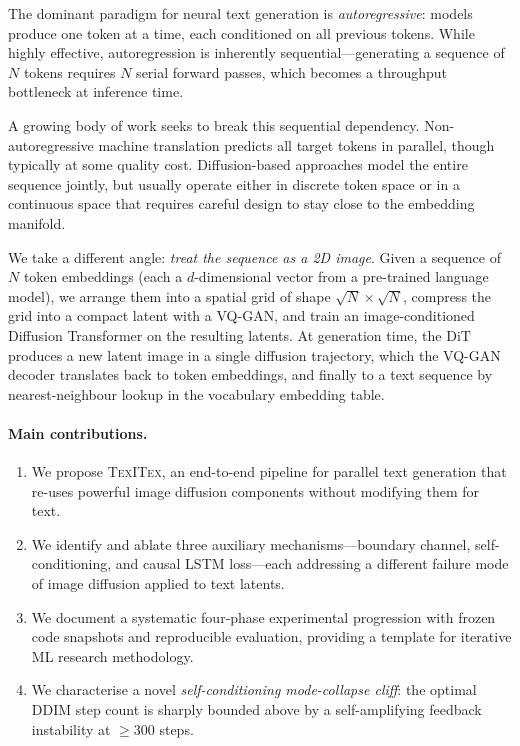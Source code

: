 \documentclass[11pt,a4paper]{article}
\newcommand{\texitex}{\textsc{TexITex}}
\begin{document}
The dominant paradigm for neural text generation is \emph{autoregressive}: models produce
one token at a time, each conditioned on all previous tokens. While highly effective,
autoregression is inherently sequential---generating a sequence of $N$ tokens requires
$N$ serial forward passes, which becomes a throughput bottleneck at inference time.

A growing body of work seeks to break this sequential dependency.
Non-autoregressive machine translation \citep{gu2018nat} predicts all target tokens
in parallel, though typically at some quality cost.
Diffusion-based approaches \citep{li2022diffusionlm,gong2023diffuseq,lovelace2023latent}
model the entire sequence jointly, but usually operate either in discrete token space
or in a continuous space that requires careful design to stay close to the embedding
manifold.

We take a different angle: \emph{treat the sequence as a 2D image}.
Given a sequence of $N$ token embeddings (each a $d$-dimensional vector from a
pre-trained language model), we arrange them into a spatial grid of shape
$\sqrt{N} \times \sqrt{N}$, compress the grid into a compact latent with a VQ-GAN,
and train an image-conditioned Diffusion Transformer on the resulting latents.
At generation time, the DiT produces a new latent image in a single diffusion trajectory,
which the VQ-GAN decoder translates back to token embeddings, and finally to a text
sequence by nearest-neighbour lookup in the vocabulary embedding table.

\paragraph{Main contributions.}
\begin{enumerate}[leftmargin=1.5em, itemsep=2pt]
  \item We propose \texitex, an end-to-end pipeline for parallel text generation that
    re-uses powerful image diffusion components without modifying them for text.
  \item We identify and ablate three auxiliary mechanisms---boundary channel,
    self-conditioning, and causal LSTM loss---each addressing a different failure mode
    of image diffusion applied to text latents.
  \item We document a systematic four-phase experimental progression with frozen code
    snapshots and reproducible evaluation, providing a template for iterative ML
    research methodology.
  \item We characterise a novel \emph{self-conditioning mode-collapse cliff}:
    the optimal DDIM step count is sharply bounded above by a self-amplifying
    feedback instability at $\geq$300 steps.
\end{enumerate}
\end{document}
